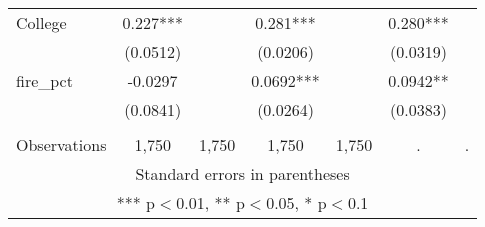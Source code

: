 \begin{tabular}{lcccccc}
College & 0.227*** &  & 0.281*** &  & 0.280*** &  \\
 & (0.0512) &  & (0.0206) &  & (0.0319) &  \\
fire\_pct & -0.0297 &  & 0.0692*** &  & 0.0942** &  \\
 & (0.0841) &  & (0.0264) &  & (0.0383) &  \\
 &  &  &  &  &  &  \\
 Observations & 1,750 & 1,750 & 1,750 & 1,750 & . & . \\ \hline
\multicolumn{7}{c}{ Standard errors in parentheses} \\
\multicolumn{7}{c}{ *** p$<$0.01, ** p$<$0.05, * p$<$0.1} \\
\end{tabular}
